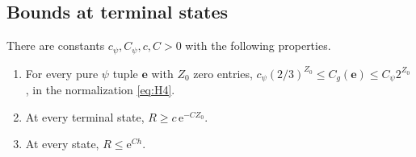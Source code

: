 \subsection{Bounds at terminal states}\label{elementary-terminal-bounds-and-a-global-crude-estimate}

\begin{lemma}\label{lem:terminal}
There are constants \(c_\psi,C_\psi,c,C>0\) with the following properties.
\begin{enumerate}[label=\textup{(\roman*)},leftmargin=*]
\item For every pure \(\psi\) tuple \(\mathbf e\) with \(Z_0\) zero entries,
\(c_\psi(2/3)^{Z_0}\le C_g(\mathbf e)\le C_\psi2^{Z_0}\), in the normalization
\eqref{eq:H4}.
\item At every terminal state, \(R\ge c\,\mathrm e^{-CZ_0}\).
\item At every state, \(R\le\mathrm e^{Ch}\).
\end{enumerate}
\end{lemma}

